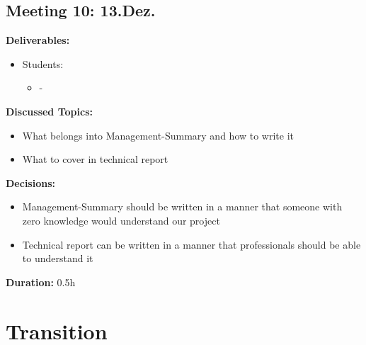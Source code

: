 \subsection*{Meeting 10: 13.Dez.}
\textbf{Deliverables:}
\begin{itemize}
    \item Students:
    \begin{itemize}
        \item -
    \end{itemize}
\end{itemize} 
\textbf{Discussed Topics:}
\begin{itemize}
    \item What belongs into Management-Summary and how to write it
    \item What to cover in technical report
\end{itemize}
\textbf{Decisions:}
\begin{itemize}
    \item Management-Summary should be written in a manner that someone with zero knowledge would understand our project
    \item Technical report can be written in a manner that professionals should be able to understand it
\end{itemize}
\textbf{Duration:} 0.5h

\section{Transition}
